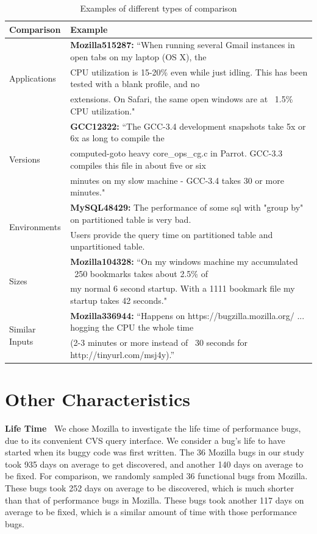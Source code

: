 \begin{table}[tb!]
\scriptsize
\centering
{
\begin{tabular}{ll}
\toprule
{\bf Comparison} & {\bf Example}\\
\midrule 
\multirow{3}{0.8in}{Applications} & {\bf Mozilla515287:} ``When running several Gmail instances in open tabs on my laptop (OS X), the \\
& CPU utilization is 15-20\% even while just idling. This has been tested with a blank profile, and no \\
& extensions. On Safari, the same open windows are at ~1.5\% CPU utilization."\\
\midrule
\multirow{3}{0.8in}{Versions} & {\bf GCC12322:} ``The GCC-3.4 development snapshots take 5x or 6x as long to compile the \\
& computed-goto heavy core\_ops\_cg.c in Parrot. GCC-3.3 compiles this file in about five or six \\
& minutes on my slow  machine - GCC-3.4 takes 30 or more minutes."\\
\midrule
\multirow{2}{0.8in}{Environments} & {\bf MySQL48429:} The performance of some sql with "group by" on partitioned table is very bad.\\
&Users provide the query time on partitioned table and unpartitioned table. \\
\midrule
\multirow{2}{0.8in}{Sizes} & {\bf Mozilla104328:} ``On my windows machine my accumulated ~250 bookmarks takes about 2.5\% of  \\
&my normal 6 second startup. With a 1111 bookmark file my startup takes 42 seconds."\\
\midrule
\multirow{2}{0.8in}{Similar Inputs} & {\bf Mozilla336944:} ``Happens on https://bugzilla.mozilla.org/ ... hogging the CPU the whole time\\
& (2-3 minutes or more instead of ~30 seconds for http://tinyurl.com/msj4y).'' \\
\bottomrule
\end{tabular}
\caption{Examples of different types of comparison}
\label{tab:example}
}
\end{table}







\section{Other Characteristics}
\label{sec:char_life}
{\bf Life Time\ } We chose Mozilla to investigate the life time of performance bugs, 
due to its convenient CVS query interface.
We consider a bug's life to have started when its buggy code
was first written. The 36 Mozilla bugs in our study
took 935 days on average to get discovered, and another 140 days on average
to be fixed.
For comparison, we randomly sampled 36 functional bugs from Mozilla.
These bugs took 252 days on average to be discovered, which is much shorter 
than that of performance bugs in Mozilla.
These bugs took another 117
days on average to be fixed, which is a similar amount of time with those
performance bugs.

